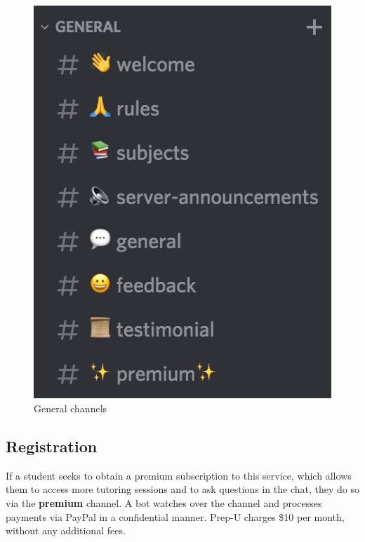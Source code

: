 \documentclass{business}
\begin{document}
    \begin{figure}[H]
        \centering
        \caption{General channels}
        \includegraphics[scale=0.5]{images/general-channels-2.png}
    \end{figure}
    \subsection{Registration}\label{registration}
    If a student seeks to obtain a premium subscription to this service, which allows them to access more tutoring sessions and to ask questions in the chat, they do so via the \textbf{premium} channel. A bot watches over the channel and processes payments via PayPal in a confidential manner. Prep-U charges \$10 per month, without any additional fees.
\end{document}
